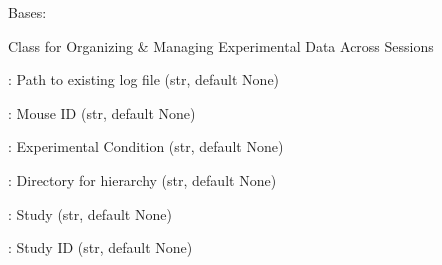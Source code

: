 \documentclass[letterpaper,10pt,english]{sphinxmanual}
\begin{document}

\begin{fulllineitems}
\label{\detokenize{ExperimentHierarchy:ExperimentHierarchy.ExperimentData}}
\pysigstartsignatures
{}
\pysigstopsignatures
\sphinxAtStartPar
Bases: 

\sphinxAtStartPar
Class for Organizing \& Managing Experimental Data Across Sessions
\begin{description}
\begin{DUlineblock}{0em}
\item[]  : Path to existing log file (str, default None)
\item[]  : Mouse ID (str, default None)
\item[]  : Experimental Condition (str, default None)
\item[]  : Directory for hierarchy (str, default None)
\item[]  : Study (str, default None)
\item[]  : Study ID (str, default None)
\end{DUlineblock}


\end{description}
\end{fulllineitems}
\end{document}

